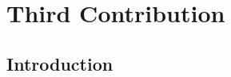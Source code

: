\chapter{Third Contribution}

\begin{intro_block}
\lipsum[1]
\end{intro_block}

\section{Introduction}\label{c5sec:intro}

